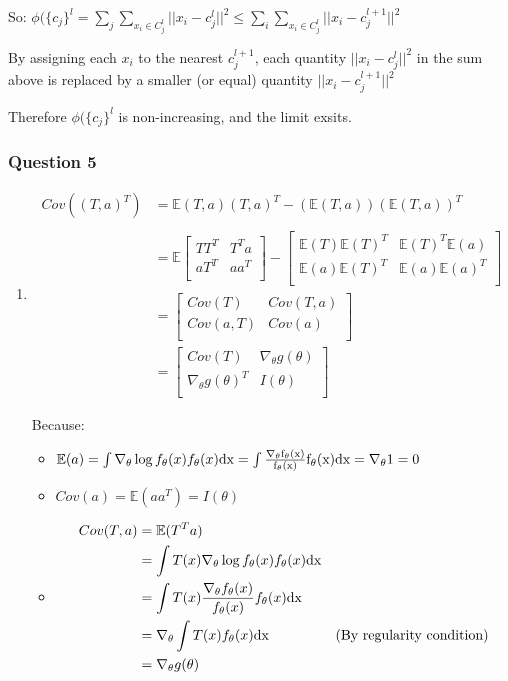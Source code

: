 \documentclass[12pt]{article}
\newcommand{\Q}[1]{\subsubsection*{Question #1}}
\newcommand{\Es}[1]{\mathbb{E}(#1)}
\begin{document}
So: $\phi(\{c_j\}^l = \sum_j \sum_{x_i \in C_j^l} ||x_i - c_j^l||^2 \leq\sum_i \sum_{x_i \in C_j^l} ||x_i - c_j^{l+1}||^2$

By assigning each $x_i$ to the nearest $c_j^{l+1}$, each quantity $||x_i - c_j^l||^2$ in the sum above is replaced by a smaller (or equal) quantity $||x_i - c_j^{l+1}||^2$


Therefore $\phi(\{c_j\}^l$ is non-increasing, and the limit exsits.



\Q{5}

\begin{enumerate}
\item 

\begin{align*}
Cov( (T, a)^T ) &= \mathbb{E} (T, a) (T, a)^T -  (\mathbb{E} (T, a))(\mathbb{E} (T, a))^T\\
\\ &= \mathbb{E} 
\begin{bmatrix}TT^T & T^T a \\ aT^T & aa^T \\\end{bmatrix} 
- \begin{bmatrix}\Es T \Es T^T & \Es T^T \Es a \\ \Es a \Es T^T & \Es a \Es a^T \\\end{bmatrix} 
\\ &= 
\begin{bmatrix}Cov(T) & Cov(T,a) \\ Cov(a,T) & Cov(a) \\\end{bmatrix} 
\\ &= 
\begin{bmatrix}Cov(T) & \nabla_\theta g(\theta) \\ \nabla_\theta g(\theta)^T & I(\theta) \\\end{bmatrix} 
\end{align*}

Because:
\begin{itemize}
\item $\Es{a} = \int \nabla_\theta \log f_\theta(x) f_\theta(x) \rm{d}x 
= \int \frac{\nabla_\theta f_\theta(x)}{f_\theta(x)}f_\theta(x) \rm{d}x = \nabla_\theta 1 = 0$
\item $Cov(a) = \Es{aa^T} = I(\theta)$

\item
\begin{align*}
Cov(T, a) &= \Es{T^T a} \\
&= \int T(x) \nabla_\theta \log f_{\theta}(x)  f_{\theta}(x)\rm{d}x \\
&= \int T(x) \frac{\nabla_\theta f_{\theta}(x)}{ f_{\theta}(x)} f_{\theta}(x)\rm{d}x \\
&= \nabla_\theta \int T(x) f_{\theta}(x)\rm{d}x & \text{(By regularity condition)} \\
&= \nabla_\theta g(\theta)
\end{align*}
\end{itemize}


\end{enumerate}
\end{document}
